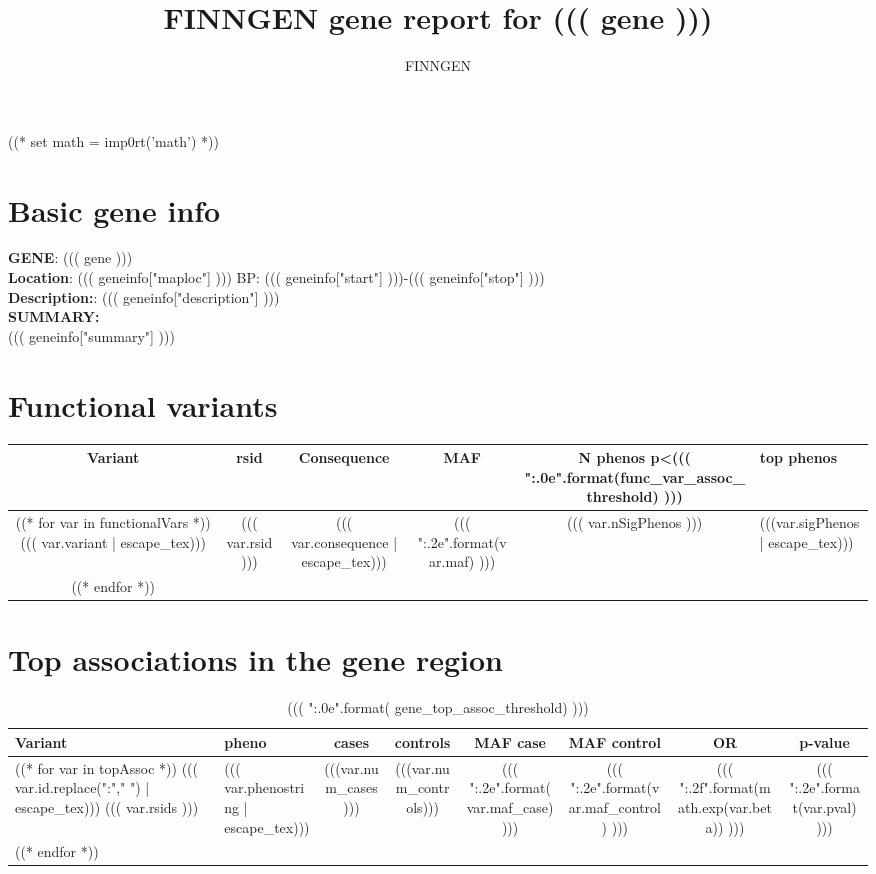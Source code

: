 \documentclass{article}
\begin{document}
\title {FINNGEN gene report for ((( gene ))) }
\author{FINNGEN}
\maketitle
\newpage
\newpage
((* set math = imp0rt('math') *))
\section{ Basic gene info }
\textbf{GENE}: ((( gene ))) \\
\medskip
\textbf{Location}: ((( geneinfo["maploc"] ))) BP: ((( geneinfo["start"] )))-((( geneinfo["stop"] ))) \\
\medskip
\textbf{Description:}: ((( geneinfo["description"] ))) \\
\medskip
\textbf{SUMMARY:} \\
((( geneinfo["summary"] )))
\newpage



\begingroup
\renewcommand{\arraystretch}{1.5}
\section{ Functional variants }
\begin{longtable}{c|c|c|c|c|L{5cm} }
Variant & rsid & Consequence & MAF & N phenos p\textless((( "{:.0e}".format(func_var_assoc_threshold) ))) & top phenos \\
\hline

((* for var in functionalVars *))
    ((( var.variant | escape_tex))) & ((( var.rsid ))) & (((  var.consequence | escape_tex))) & ((( "{:.2e}".format(var.maf) ))) & ((( var.nSigPhenos ))) & (((var.sigPhenos| escape_tex)))  \\
((* endfor *))

\end{longtable}
\newpage

\section{ Top associations in the gene region }
\begin{longtable}{ >{\RaggedRight}p{3cm}|>{\RaggedRight}p{3cm}|c|c|c|c|c|c }
\caption{ ((( ":.0e".format( gene_top_assoc_threshold) )))}\\
Variant & pheno & cases & controls & MAF case & MAF control & OR & p-value  \\
\hline
((* for var in topAssoc *))
((( var.id.replace(":"," ") | escape_tex))) \newline ((( var.rsids ))) & ((( var.phenostring | escape_tex))) & (((var.num_cases ))) & (((var.num_controls))) & ((( "{:.2e}".format(var.maf_case) ))) & ((( "{:.2e}".format(var.maf_control) ))) & ((( "{:.2f}".format(math.exp(var.beta)) ))) & ((( "{:.2e}".format(var.pval) ))) \\
((* endfor *))
\end{longtable}
\end{document}

